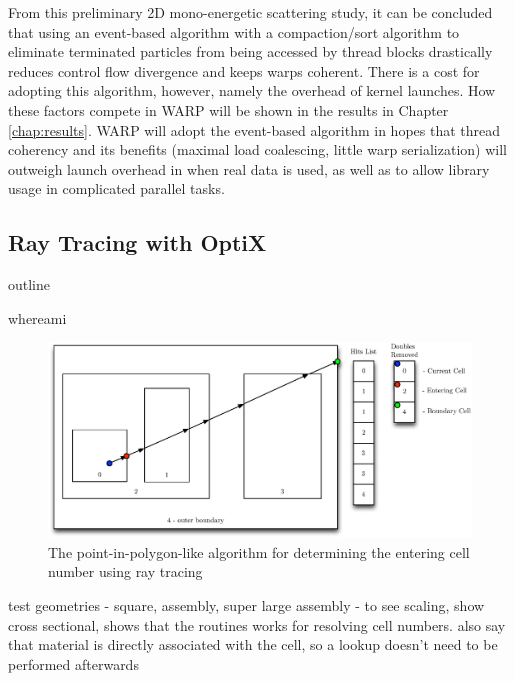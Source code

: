 From this preliminary 2D mono-energetic scattering study, it can be concluded that using an event-based algorithm with a compaction/sort algorithm to eliminate terminated particles from being accessed by thread blocks drastically reduces control flow divergence and keeps warps coherent.  There is a cost for adopting this algorithm, however, namely the overhead of kernel launches.  How these factors compete in WARP will be shown in the results in Chapter \ref{chap:results}.  WARP will adopt the event-based algorithm in hopes that thread coherency and its benefits (maximal load coalescing, little warp serialization) will outweigh launch overhead in when real data is used, as well as to allow library usage in complicated parallel tasks.

\subsection{Ray Tracing with OptiX}

outline

whereami

\begin{figure}[h!] 
  \centering
    \includegraphics[width=1.0\textwidth]{graphics/whereami.eps}
     \caption{The point-in-polygon-like algorithm for determining the entering cell number using ray tracing \label{whereami} }
\end{figure}

test geometries - square, assembly, super large assembly - to see scaling, show cross sectional, shows that the routines works for resolving cell numbers.  also say that material is directly associated with the cell, so a lookup doesn't need to be performed afterwards

